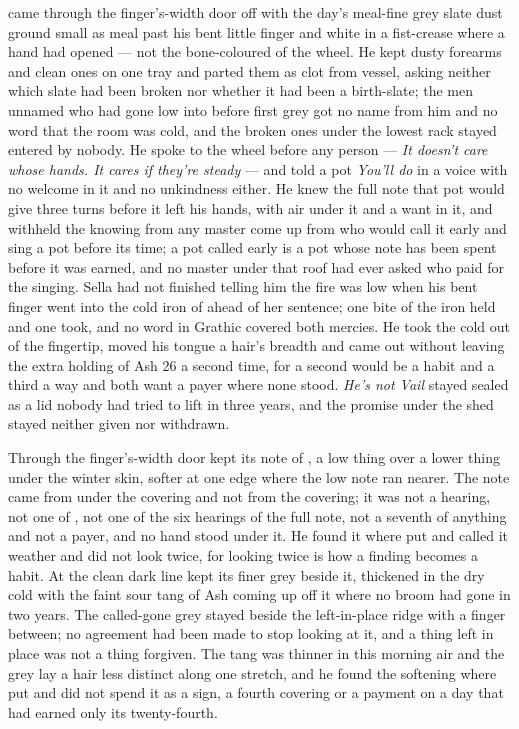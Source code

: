  came through the finger's-width door off  with the day's meal-fine grey slate dust ground small as meal past his bent little finger and white in a fist-crease where a hand had opened --- not the bone-coloured  of the wheel. He kept dusty forearms and clean ones on one tray and parted them as clot from vessel, asking neither which slate had been broken nor whether it had been a birth-slate; the men unnamed who had gone low into  before first grey got no name from him and no word that the room was cold, and the broken ones under the lowest rack stayed entered by nobody. He spoke to the wheel before any person --- \emph{It doesn't care whose hands. It cares if they're steady} --- and told a pot \emph{You'll do} in a voice with no welcome in it and no unkindness either. He knew the full note that pot would give three turns before it left his hands, with air under it and a want in it, and withheld the knowing from any master come up from  who would call it early and sing a pot before its time; a pot called early is a pot whose note has been spent before it was earned, and no master under that roof had ever asked who paid for the singing. Sella had not finished telling him the fire was low when his bent finger went into the cold iron of  ahead of her sentence; one bite of the iron held and one took, and no word in Grathic covered both mercies. He took the cold out of the fingertip, moved his tongue a hair's breadth and came out without leaving the extra holding of Ash 26 a second time, for a second would be a habit and a third a way and both want a payer where none stood. \emph{He's not Vail} stayed sealed as a lid nobody had tried to lift in three years, and the promise under the shed stayed neither given nor withdrawn.

\scenebreak

Through the finger's-width door  kept its note of , a low thing over a lower thing under the winter skin, softer at one edge where the low note ran nearer. The note came from under the covering and not from the covering; it was not a hearing, not one of , not one of the six hearings of the full note, not a seventh of anything and not a payer, and no hand stood under it. He found it where put and called it weather and did not look twice, for looking twice is how a finding becomes a habit. At  the clean dark line kept its finer grey beside it, thickened in the dry cold with the faint sour tang of Ash coming up off it where no broom had gone in two years. The called-gone grey stayed beside the left-in-place ridge with a finger between; no agreement had been made to stop looking at it, and a thing left in place was not a thing forgiven. The tang was thinner in this morning air and the grey lay a hair less distinct along one stretch, and he found the softening where put and did not spend it as a sign, a fourth covering or a payment on a day that had earned only its twenty-fourth.

